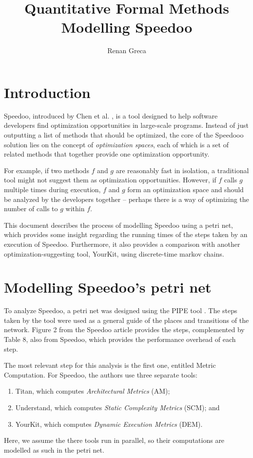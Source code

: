 \documentclass[11pt]{article}
\begin{document}
\title{Quantitative Formal Methods\\Modelling Speedoo}
\author{Renan Greca}
\maketitle

\section*{Introduction}
Speedoo, introduced by Chen et al. \cite{speedoo2018}, is a tool designed to help software developers find optimization opportunities in large-scale programs.
Instead of just outputting a list of methods that should be optimized, the core of the Speedooo solution lies on the concept of \textit{optimization spaces}, each of which is a set of related methods that together provide one optimization opportunity.

For example, if two methods $f$ and $g$ are reasonably fast in isolation, a traditional tool might not suggest them as optimization opportunities.
However, if $f$ calls $g$ multiple times during execution, $f$ and $g$ form an optimization space and should be analyzed by the developers together -- perhaps there is a way of optimizing the number of calls to $g$ within $f$.

This document describes the process of modelling Speedoo using a petri net, which provides some insight regarding the running times of the steps taken by an execution of Speedoo.
Furthermore, it also provides a comparison with another optimization-suggesting tool, YourKit, using discrete-time markov chains.

\section*{Modelling Speedoo's petri net}
To analyze Speedoo, a petri net was designed using the PIPE tool \cite{pipe2002}.
The steps taken by the tool were used as a general guide of the places and transitions of the network.
Figure 2 from the Speedoo article provides the steps, complemented by Table 8, also from Speedoo, which provides the performance overhead of each step.

The most relevant step for this analysis is the first one, entitled Metric Computation.
For Speedoo, the authors use three separate tools: 
\begin{enumerate}
	\item Titan, which computes \textit{Architectural Metrics} (AM);
	\item Understand, which computes \textit{Static Complexity Metrics} (SCM); and
	\item YourKit, which computes \textit{Dynamic Execution Metrics} (DEM).
\end{enumerate}
Here, we assume the there tools run in parallel, so their computations are modelled as such in the petri net.
\end{document}
